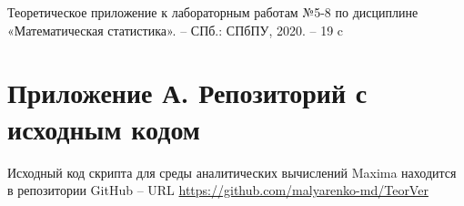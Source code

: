 \documentclass[12pt]{article}
\begin{document}
\begin{flushleft}
\newpage


\begin{thebibliography}{9}

        Теоретическое приложение к лабораторным работам №5-8 по дисциплине «Математическая статистика». -- СПб.: СПбПУ, 2020. -- 19 c
	
\end{thebibliography}

\newpage

\section*{Приложение А. Репозиторий с исходным кодом}

Исходный код скрипта для среды аналитических вычислений Maxima находится в репозитории GitHub -- URL \url{https://github.com/malyarenko-md/TeorVer}

\end{flushleft}
\end{document}
